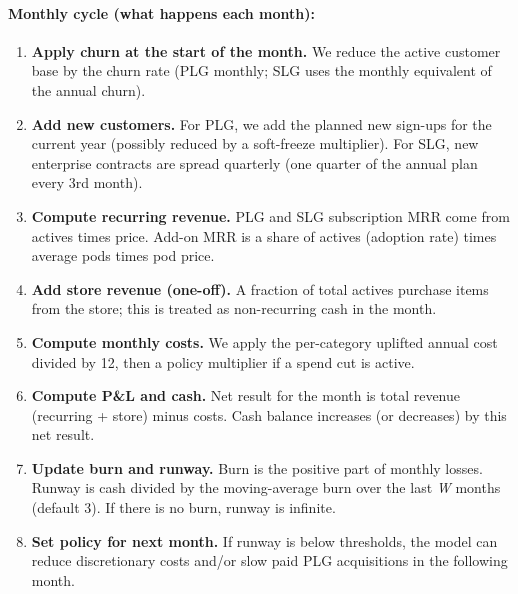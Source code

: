 \paragraph{Monthly cycle (what happens each month):}
\begin{enumerate}
\item \textbf{Apply churn at the start of the month.} We reduce the active customer base by the churn rate (PLG monthly; SLG uses the monthly equivalent of the annual churn).
\item \textbf{Add new customers.} For PLG, we add the planned new sign-ups for the current year (possibly reduced by a soft-freeze multiplier). For SLG, new enterprise contracts are spread quarterly (one quarter of the annual plan every 3rd month).
\item \textbf{Compute recurring revenue.} PLG and SLG subscription MRR come from actives times price. Add-on MRR is a share of actives (adoption rate) times average pods times pod price.
\item \textbf{Add store revenue (one-off).} A fraction of total actives purchase items from the store; this is treated as non-recurring cash in the month.
\item \textbf{Compute monthly costs.} We apply the per-category uplifted annual cost divided by 12, then a policy multiplier if a spend cut is active.
\item \textbf{Compute P\&L and cash.} Net result for the month is total revenue (recurring + store) minus costs. Cash balance increases (or decreases) by this net result.
\item \textbf{Update burn and runway.} Burn is the positive part of monthly losses. Runway is cash divided by the moving-average burn over the last \emph{W} months (default 3). If there is no burn, runway is infinite.
\item \textbf{Set policy for next month.} If runway is below thresholds, the model can reduce discretionary costs and/or slow paid PLG acquisitions in the following month.
\end{enumerate}


